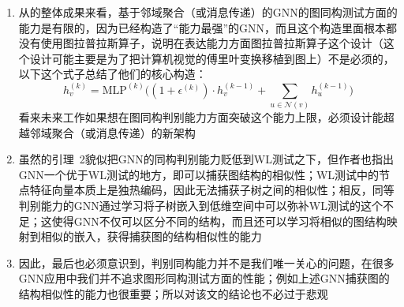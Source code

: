 \documentclass[11pt]{article}
\begin{document}
\begin{enumerate}
\item 从\cite{xu2018how}的整体成果来看，基于邻域聚合（或消息传递）的GNN的图同构测试方面的能力是有限的，因为\cite{xu2018how}已经构造了``能力最强''的GNN，而且这个构造里面根本都没有使用图拉普拉斯算子，说明在表达能力方面图拉普拉斯算子这个设计（这个设计可能主要是为了把计算机视觉的傅里叶变换移植到图上）不是必须的，以下这个式子总结了他们的核心构造：\[
h_v^{(k)}=\text{MLP}^{(k)}\big((1+\epsilon^{(k)})\cdot h_v^{(k-1)}+\sum_{u\in\mathcal{N}(v)}h_u^{(k-1)}\big)
\]看来未来工作如果想在图同构判别能力方面突破这个能力上限，必须设计能超越邻域聚合（或消息传递）的新架构
\item 虽然\cite{xu2018how}的引理~2貌似把GNN的同构判别能力贬低到WL测试之下，但作者也指出GNN一个优于WL测试的地方，即可以捕获图结构的相似性；WL测试中的节点特征向量本质上是独热编码，因此无法捕获子树之间的相似性；相反，同等判别能力的GNN通过学习将子树嵌入到低维空间中可以弥补WL测试的这个不足；这使得GNN不仅可以区分不同的结构，而且还可以学习将相似的图结构映射到相似的嵌入，获得捕获图的结构相似性的能力
\item 因此，最后也必须意识到，判别同构能力并不是我们唯一关心的问题，在很多GNN应用中我们并不追求图形同构测试方面的性能；例如上述GNN捕获图的结构相似性的能力也很重要；所以对该文的结论也不必过于悲观
\end{enumerate}

\renewcommand\refname{参考文献}


\end{document}
